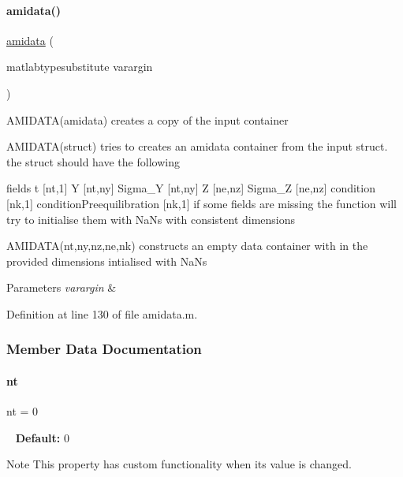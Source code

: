 \paragraph{\texorpdfstring{amidata()}{amidata()}}
{\footnotesize\ttfamily \mbox{\hyperlink{classamidata}{amidata}} (\begin{DoxyParamCaption}\item[{matlabtypesubstitute}]{varargin }\end{DoxyParamCaption})}

A\+M\+I\+D\+A\+T\+A(amidata) creates a copy of the input container

A\+M\+I\+D\+A\+T\+A(struct) tries to creates an amidata container from the input struct. the struct should have the following \begin{DoxyParagraph}{fields}
t \mbox{[}nt,1\mbox{]} Y \mbox{[}nt,ny\mbox{]} Sigma\+\_\+Y \mbox{[}nt,ny\mbox{]} Z \mbox{[}ne,nz\mbox{]} Sigma\+\_\+Z \mbox{[}ne,nz\mbox{]} condition \mbox{[}nk,1\mbox{]} condition\+Preequilibration \mbox{[}nk,1\mbox{]} if some fields are missing the function will try to initialise them with Na\+Ns with consistent dimensions
\end{DoxyParagraph}
A\+M\+I\+D\+A\+T\+A(nt,ny,nz,ne,nk) constructs an empty data container with in the provided dimensions intialised with Na\+Ns


\begin{DoxyParams}{Parameters}
{\em varargin} & \\
\hline
\end{DoxyParams}


Definition at line 130 of file amidata.\+m.



\subsubsection{Member Data Documentation}
\mbox{\label{classamidata_a03cfcdd983bff4aef77268b785b28345}} 
\paragraph{\texorpdfstring{nt}{nt}}
{\footnotesize\ttfamily nt = 0}

~\newline
{\bfseries Default\+:} 0

\begin{DoxyNote}{Note}
This property has custom functionality when its value is changed. 
\end{DoxyNote}


